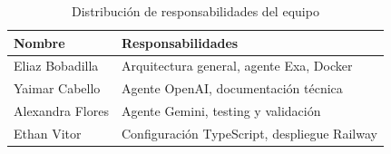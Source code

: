 \documentclass[12pt,a4paper]{article}
\begin{document}
\begin{table}[H]
\centering
\begin{tabular}{|l|l|}
\hline
\textbf{Nombre} & \textbf{Responsabilidades} \\
\hline
Eliaz Bobadilla & Arquitectura general, agente Exa, Docker \\
Yaimar Cabello & Agente OpenAI, documentación técnica \\
Alexandra Flores & Agente Gemini, testing y validación \\
Ethan Vitor & Configuración TypeScript, despliegue Railway \\
\hline
\end{tabular}
\caption{Distribución de responsabilidades del equipo}
\end{table}
\end{document}
